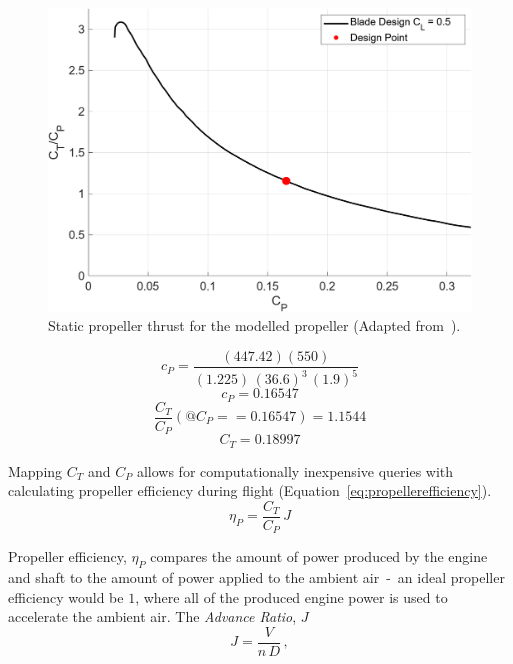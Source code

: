 \begin{figure}[!ht]\label{fig:staticpropthrust}
    \centering
    \includegraphics[width=0.85\linewidth]{Figures/StaticThrust.png}
    \caption{Static propeller thrust for the modelled propeller (Adapted from~\cite{GeneralizedMethodPropeller}).}
\end{figure}

\begin{equation}\label{eq:calcCT1}
    c_P = \frac{(447.42)(550)}{{(1.225)} \, {(36.6)}^3 \, {(1.9)}^5}
\end{equation}
\begin{equation}\label{eq:calcCT2}
    c_P = 0.16547
\end{equation}
\begin{equation}\label{eq:calcCT3}
    \frac{C_T}{C_P}(@C_P == 0.16547) = 1.1544
\end{equation}
\begin{equation}\label{eq:calcCT4}
    C_T = 0.18997
\end{equation}


Mapping \(C_T\) and \(C_P\) allows for computationally inexpensive queries with calculating propeller efficiency during flight (Equation~\ref{eq:propellerefficiency}).
\begin{equation}\label{eq:propellerefficiency}
    \eta_P = \frac{C_T}{C_P} \, J
\end{equation}

Propeller efficiency, \( \eta_P \) compares the amount of power produced by the engine and shaft to the amount of power applied to the ambient air~-~an ideal propeller efficiency would be \(1\), where all of the produced engine power is used to accelerate the ambient air. The \textit{Advance Ratio}, \(J\)
\begin{equation}\label{eq:advanceRatio}
    J = \frac{V}{n \, D} \, ,
\end{equation}

